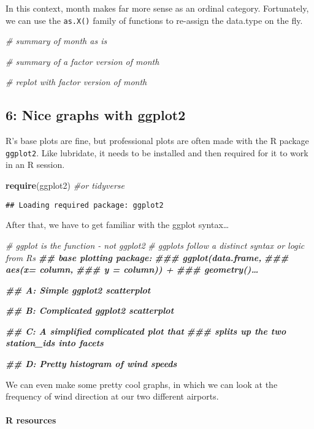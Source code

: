 \documentclass[
]{article}
\newenvironment{Shaded}{\begin{snugshade}}{\end{snugshade}}
\newcommand{\CommentTok}[1]{\textcolor[rgb]{0.56,0.35,0.01}{\textit{#1}}}
\newcommand{\DocumentationTok}[1]{\textcolor[rgb]{0.56,0.35,0.01}{\textbf{\textit{#1}}}}
\newcommand{\FunctionTok}[1]{\textcolor[rgb]{0.13,0.29,0.53}{\textbf{#1}}}
\newcommand{\NormalTok}[1]{#1}
\begin{document}
In this context, month makes far more sense as an ordinal category.
Fortunately, we can use the \texttt{as.X()} family of functions to
re-assign the data.type on the fly.

\begin{Shaded}
\begin{Highlighting}[]
\CommentTok{\# summary of month as is}

\CommentTok{\# summary of a factor version of month}

\CommentTok{\# replot with factor version of month}
\end{Highlighting}
\end{Shaded}

\subsection{6: Nice graphs with ggplot2}\label{nice-graphs-with-ggplot2}

R's base plots are fine, but professional plots are often made with the
R package \texttt{ggplot2}. Like lubridate, it needs to be installed and
then required for it to work in an R session.

\begin{Shaded}
\begin{Highlighting}[]
\FunctionTok{require}\NormalTok{(ggplot2) }\CommentTok{\#or tidyverse}
\end{Highlighting}
\end{Shaded}

\begin{verbatim}
## Loading required package: ggplot2
\end{verbatim}

After that, we have to get familiar with the ggplot syntax\ldots{}

\begin{Shaded}
\begin{Highlighting}[]
\CommentTok{\# ggplot is the function {-} not ggplot2}
\CommentTok{\# ggplots follow a distinct syntax or logic from R\textquotesingle{}s}
\DocumentationTok{\#\# base plotting package:}
\DocumentationTok{\#\#\#  ggplot(data.frame,}
\DocumentationTok{\#\#\#        aes(x= column, }
\DocumentationTok{\#\#\#            y = column)) +}
\DocumentationTok{\#\#\#     geometry()…  }

\DocumentationTok{\#\# A: Simple ggplot2 scatterplot}


\DocumentationTok{\#\# B: Complicated ggplot2 scatterplot}


\DocumentationTok{\#\# C: A simplified complicated plot that}
\DocumentationTok{\#\#\# splits up the two station\_ids into facets}


\DocumentationTok{\#\# D: Pretty histogram of wind speeds}
\end{Highlighting}
\end{Shaded}

We can even make some pretty cool graphs, in which we can look at the
frequency of wind direction at our two different airports.

\paragraph{R resources}\label{r-resources}
\end{document}

